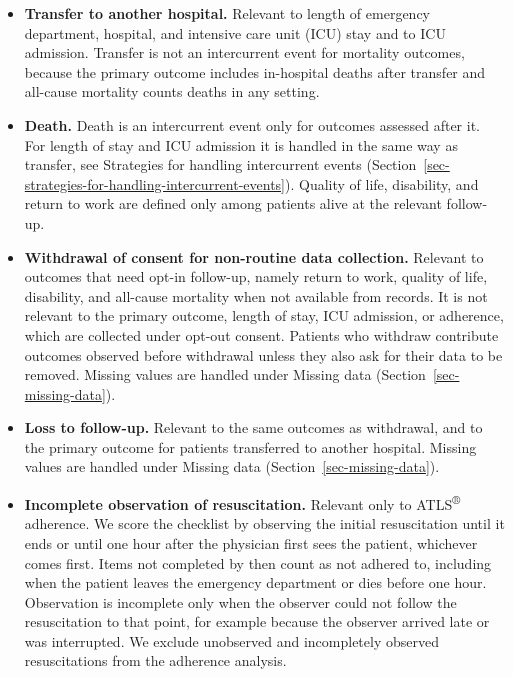 \documentclass[
]{scrartcl}
\providecommand{\tightlist}{%
  \setlength{\itemsep}{0pt}\setlength{\parskip}{0pt}}\usepackage{longtable,booktabs,array}
\begin{document}
\begin{itemize}
\tightlist
\item
  \textbf{Transfer to another hospital.} Relevant to length of emergency
  department, hospital, and intensive care unit (ICU) stay and to ICU
  admission. Transfer is not an intercurrent event for mortality
  outcomes, because the primary outcome includes in-hospital deaths
  after transfer and all-cause mortality counts deaths in any setting.
\item
  \textbf{Death.} Death is an intercurrent event only for outcomes
  assessed after it. For length of stay and ICU admission it is handled
  in the same way as transfer, see
  Strategies for handling intercurrent events
  (Section~\ref{sec-strategies-for-handling-intercurrent-events}).
  Quality of life, disability, and return to work are defined only among
  patients alive at the relevant follow-up.
\item
  \textbf{Withdrawal of consent for non-routine data collection.}
  Relevant to outcomes that need opt-in follow-up, namely return to
  work, quality of life, disability, and all-cause mortality when not
  available from records. It is not relevant to the primary outcome,
  length of stay, ICU admission, or adherence, which are collected under
  opt-out consent. Patients who withdraw contribute outcomes observed
  before withdrawal unless they also ask for their data to be removed.
  Missing values are handled under Missing data
  (Section~\ref{sec-missing-data}).
\item
  \textbf{Loss to follow-up.} Relevant to the same outcomes as
  withdrawal, and to the primary outcome for patients transferred to
  another hospital. Missing values are handled under Missing data
  (Section~\ref{sec-missing-data}).
\item
  \textbf{Incomplete observation of resuscitation.} Relevant only to
  ATLS\textsuperscript{®} adherence. We score the checklist by observing
  the initial resuscitation until it ends or until one hour after the
  physician first sees the patient, whichever comes first. Items not
  completed by then count as not adhered to, including when the patient
  leaves the emergency department or dies before one hour. Observation
  is incomplete only when the observer could not follow the
  resuscitation to that point, for example because the observer arrived
  late or was interrupted. We exclude unobserved and incompletely
  observed resuscitations from the adherence analysis.
\end{itemize}
\end{document}
